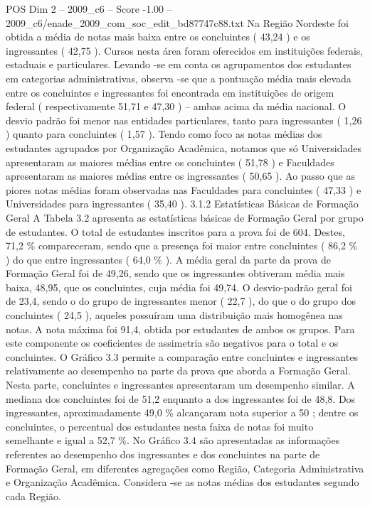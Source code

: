 \begin{textsample}{POS Dim 2 – 2009\_c6 – Score -1.00 – 2009\_c6/enade\_2009\_com\_soc\_edit\_bd87747c88.txt}
Na Região Nordeste foi obtida a média de notas mais baixa entre os concluintes ( 43,24 ) e os ingressantes ( 42,75 ).
Cursos nesta área foram oferecidos em instituições federais, estaduais e particulares.
Levando -se em conta os agrupamentos dos estudantes em categorias administrativas, observa -se que a pontuação média mais elevada entre os concluintes e ingressantes foi encontrada em instituições de origem federal ( respectivamente 51,71 e 47,30 ) – ambas acima da média nacional.
O desvio padrão foi menor nas entidades particulares, tanto para ingressantes ( 1,26 ) quanto para concluintes ( 1,57 ).
Tendo como foco as notas médias dos estudantes agrupados por Organização Acadêmica, notamos que só Universidades apresentaram as maiores médias entre os concluintes ( 51,78 ) e Faculdades apresentaram as maiores médias entre os ingressantes ( 50,65 ).
Ao passo que as piores notas médias foram observadas nas Faculdades para concluintes ( 47,33 ) e Universidades para ingressantes ( 35,40 ). 3.1.2 Estatísticas Básicas de Formação Geral A Tabela 3.2 apresenta as estatísticas básicas de Formação Geral por grupo de estudantes.
O total de estudantes inscritos para a prova foi de 604.
Destes, 71,2 \% compareceram, sendo que a presença foi maior entre concluintes ( 86,2 \% ) do que entre ingressantes ( 64,0 \% ).
A média geral da parte da prova de Formação Geral foi de 49,26, sendo que os ingressantes obtiveram média mais baixa, 48,95, que os concluintes, cuja média foi 49,74.
O desvio-padrão geral foi de 23,4, sendo o do grupo de ingressantes menor ( 22,7 ), do que o do grupo dos concluintes ( 24,5 ), aqueles possuíram uma distribuição mais homogênea nas notas.
A nota máxima foi 91,4, obtida por estudantes de ambos os grupos.
Para este componente os coeficientes de assimetria são negativos para o total e os concluintes.
O Gráfico 3.3 permite a comparação entre concluintes e ingressantes relativamente ao desempenho na parte da prova que aborda a Formação Geral.
Nesta parte, concluintes e ingressantes apresentaram um desempenho similar.
A mediana dos concluintes foi de 51,2 enquanto a dos ingressantes foi de 48,8.
Dos ingressantes, aproximadamente 49,0 \% alcançaram nota superior a 50 ; dentre os concluintes, o percentual dos estudantes nesta faixa de notas foi muito semelhante e igual a 52,7 \%.
No Gráfico 3.4 são apresentadas as informações referentes ao desempenho dos ingressantes e dos concluintes na parte de Formação Geral, em diferentes agregações como Região, Categoria Administrativa e Organização Acadêmica.
Considera -se as notas médias dos estudantes segundo cada Região.

\end{textsample}
